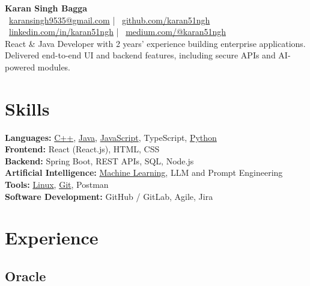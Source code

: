 \documentclass[a4paper,12pt]{article}
\newcommand{\linuxGitHub}{\href{https://github.com/karan51ngh/karan51ngh}{Linux}}
\newcommand{\gitGitHub}{\href{https://github.com/karan51ngh/gitCheatSheet}{Git}}
\newcommand{\jsGitHub}{\href{https://github.com/karan51ngh?tab=repositories&q=&type=&language=javascript}{JavaScript}}
\newcommand{\cppGitHub}{\href{https://github.com/karan51ngh/topicWiseQuestions}{C++}}
\newcommand{\pythonGitHub}{\href{https://github.com/karan51ngh?tab=repositories&q=&type=&language=python}{Python}}
\newcommand{\MachineLearning}{\href{https://github.com/karan51ngh/machineLearning}{Machine Learning}}
\newcommand{\Java}{\href{https://github.com/karan51ngh/javaprogramming}{Java}}
\begin{document}
\begin{center}
  {\LARGE \textbf{Karan Singh Bagga}} \\
  
  \faEnvelope\ \href{mailto:karansingh9535@gmail.com}{karansingh9535@gmail.com} | 
  \faGithub\ \href{https://github.com/karan51ngh}{github.com/karan51ngh} \\ 
  \faLinkedin\ \href{https://linkedin.com/in/karan51ngh}{linkedin.com/in/karan51ngh} |
  \faMedium\ \href{https://medium.com/@karan51ngh}{medium.com/@karan51ngh}
  \\
  \vspace{0.8em}
  React \& Java Developer with 2 years’ experience building enterprise applications. Delivered end-to-end UI and backend features, including secure APIs and AI-powered modules.
\end{center}


\section*{Skills}
\textbf{Languages:} \cppGitHub, \Java, \jsGitHub, TypeScript, \pythonGitHub \\
\textbf{Frontend:} React (React.js), HTML, CSS \\
\textbf{Backend:} Spring Boot, REST APIs, SQL, Node.js\\
\textbf {Artificial Intelligence:} \MachineLearning, LLM and Prompt Engineering \\
\textbf{Tools:} \linuxGitHub, \gitGitHub, Postman \\
\textbf{Software Development:} GitHub / GitLab, Agile, Jira

\section*{Experience}
\subsection*{\textbf{Oracle}}
\end{document}
